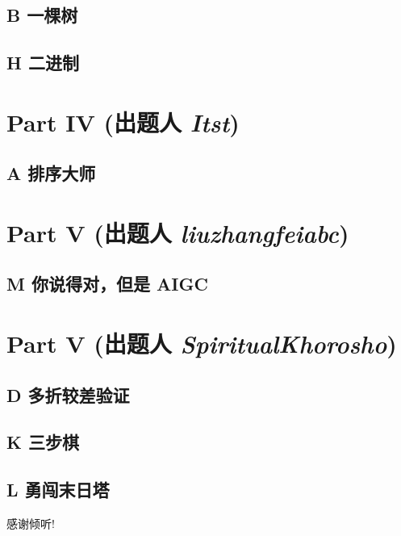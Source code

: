 \documentclass[dvipsnames]{ctexbeamer}
\begin{document}
\subsection{B 一棵树}


\subsection{H 二进制}


\section{Part IV (出题人 {\itshape Itst})}

\subsection{A 排序大师}



\section{Part V (出题人 {\itshape liuzhangfeiabc})}

\subsection{M 你说得对，但是 AIGC}


\section{Part V (出题人 {\itshape SpiritualKhorosho})}

\subsection{D 多折较差验证}


\subsection{K 三步棋}


\subsection{L 勇闯末日塔}


\begin{frame}{}
    \begin{center}
        \Large 感谢倾听!
    \end{center}
\end{frame}
\end{document}
